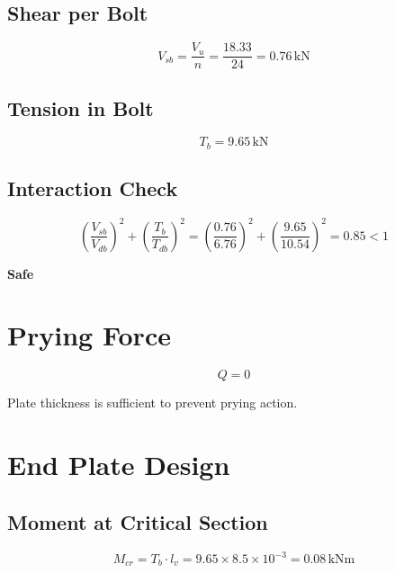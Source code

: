 \subsection{Shear per Bolt}

\begin{equation}
V_{sb} = \frac{V_u}{n} = \frac{18.33}{24} = 0.76 \, \text{kN}
\end{equation}

\subsection{Tension in Bolt}

\begin{equation}
T_b = 9.65 \, \text{kN}
\end{equation}

\subsection{Interaction Check}

\begin{equation}
\left(\frac{V_{sb}}{V_{db}}\right)^2 + \left(\frac{T_b}{T_{db}}\right)^2
= \left(\frac{0.76}{6.76}\right)^2 + \left(\frac{9.65}{10.54}\right)^2
= 0.85 < 1
\end{equation}

\textbf{Safe}

\section{Prying Force}

\begin{equation}
Q = 0
\end{equation}

Plate thickness is sufficient to prevent prying action.

\section{End Plate Design}

\subsection{Moment at Critical Section}

\begin{equation}
M_{cr} = T_b \cdot l_v = 9.65 \times 8.5 \times 10^{-3} = 0.08 \, \text{kNm}
\end{equation}

